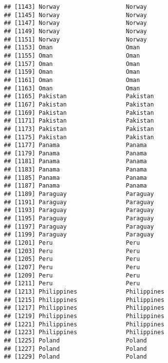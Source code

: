 \documentclass[]{article}
\begin{document}
\begin{verbatim}
## [1143] Norway                   Norway                  
## [1145] Norway                   Norway                  
## [1147] Norway                   Norway                  
## [1149] Norway                   Norway                  
## [1151] Norway                   Norway                  
## [1153] Oman                     Oman                    
## [1155] Oman                     Oman                    
## [1157] Oman                     Oman                    
## [1159] Oman                     Oman                    
## [1161] Oman                     Oman                    
## [1163] Oman                     Oman                    
## [1165] Pakistan                 Pakistan                
## [1167] Pakistan                 Pakistan                
## [1169] Pakistan                 Pakistan                
## [1171] Pakistan                 Pakistan                
## [1173] Pakistan                 Pakistan                
## [1175] Pakistan                 Pakistan                
## [1177] Panama                   Panama                  
## [1179] Panama                   Panama                  
## [1181] Panama                   Panama                  
## [1183] Panama                   Panama                  
## [1185] Panama                   Panama                  
## [1187] Panama                   Panama                  
## [1189] Paraguay                 Paraguay                
## [1191] Paraguay                 Paraguay                
## [1193] Paraguay                 Paraguay                
## [1195] Paraguay                 Paraguay                
## [1197] Paraguay                 Paraguay                
## [1199] Paraguay                 Paraguay                
## [1201] Peru                     Peru                    
## [1203] Peru                     Peru                    
## [1205] Peru                     Peru                    
## [1207] Peru                     Peru                    
## [1209] Peru                     Peru                    
## [1211] Peru                     Peru                    
## [1213] Philippines              Philippines             
## [1215] Philippines              Philippines             
## [1217] Philippines              Philippines             
## [1219] Philippines              Philippines             
## [1221] Philippines              Philippines             
## [1223] Philippines              Philippines             
## [1225] Poland                   Poland                  
## [1227] Poland                   Poland                  
## [1229] Poland                   Poland                  

\end{verbatim}
\end{document}
